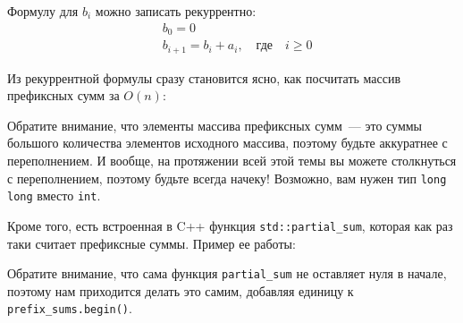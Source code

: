 \begin{observation}
    Формулу для $b_i$ можно записать рекуррентно:
\begin{align*}
&    b_0 = 0\\
&    b_{i + 1} = b_{i} + a_{i}, \quad \text{где} \quad i \ge 0
\end{align*}
\end{observation}

Из рекуррентной формулы сразу становится ясно, как посчитать массив префиксных сумм за $O(n)$:


\begin{observation}
    Обратите внимание, что элементы массива префиксных сумм~--- это суммы большого количества элементов исходного массива, поэтому будьте аккуратнее с переполнением. И вообще, на протяжении всей этой темы вы можете столкнуться с переполнением, поэтому будьте всегда начеку! Возможно, вам нужен тип \verb+long long+ вместо \verb+int+.
\end{observation}

Кроме того, есть встроенная в C++ функция \verb+std::partial_sum+, которая как раз таки считает префиксные суммы. Пример ее работы:


Обратите внимание, что сама функция \verb+partial_sum+ не оставляет нуля в начале, поэтому нам приходится делать это самим, добавляя единицу к \verb+prefix_sums.begin()+.

